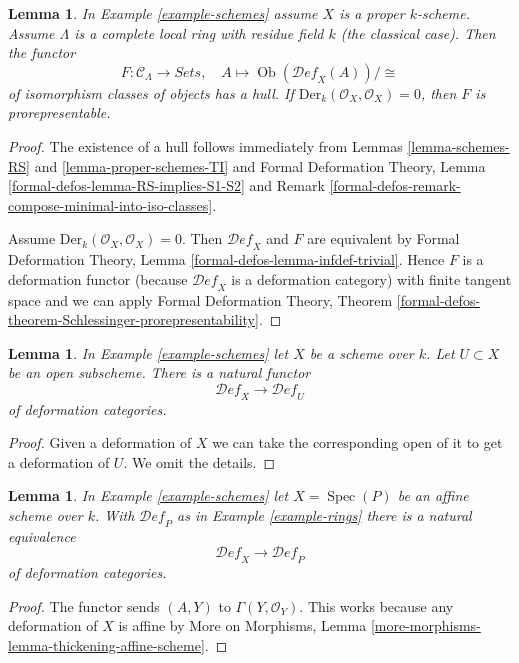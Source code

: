 \documentclass{stacks-project}
\theoremstyle{plain}
\newtheorem{lemma}[subsection]{Lemma}
\theoremstyle{definition}
\theoremstyle{remark}
\numberwithin{equation}{subsection}
\def\Spec{\mathop{\mathrm{Spec}}}
\def\Ob{\mathop{\mathrm{Ob}}\nolimits}
\def\Deformationcategory{\mathcal{D}\!\mathit{ef}}
\begin{document}
\begin{lemma}
\label{lemma-schemes-hull}
In Example \ref{example-schemes} assume $X$ is a proper $k$-scheme.
Assume $\Lambda$ is a complete local ring with residue field $k$
(the classical case). Then the functor
$$
F : \mathcal{C}_\Lambda \longrightarrow \textit{Sets},\quad
A \longmapsto \Ob(\Deformationcategory_X(A))/\cong
$$
of isomorphism classes of objects has a hull. If
$\text{Der}_k(\mathcal{O}_X, \mathcal{O}_X) = 0$, then
$F$ is prorepresentable.
\end{lemma}

\begin{proof}
The existence of a hull follows immediately from
Lemmas \ref{lemma-schemes-RS} and \ref{lemma-proper-schemes-TI} and
Formal Deformation Theory, Lemma \ref{formal-defos-lemma-RS-implies-S1-S2}
and Remark \ref{formal-defos-remark-compose-minimal-into-iso-classes}.

\medskip\noindent
Assume $\text{Der}_k(\mathcal{O}_X, \mathcal{O}_X) = 0$. Then
$\Deformationcategory_X$ and $F$ are equivalent by
Formal Deformation Theory, Lemma \ref{formal-defos-lemma-infdef-trivial}.
Hence $F$ is a deformation functor (because $\Deformationcategory_X$ is a
deformation category) with finite tangent space and we can apply
Formal Deformation Theory, Theorem
\ref{formal-defos-theorem-Schlessinger-prorepresentability}.
\end{proof}

\begin{lemma}
\label{lemma-open}
In Example \ref{example-schemes} let $X$ be a scheme over $k$.
Let $U \subset X$ be an open subscheme.
There is a natural functor
$$
\Deformationcategory_X \longrightarrow \Deformationcategory_U
$$
of deformation categories.
\end{lemma}

\begin{proof}
Given a deformation of $X$ we can take the corresponding open
of it to get a deformation of $U$. We omit the details.
\end{proof}

\begin{lemma}
\label{lemma-affine}
In Example \ref{example-schemes} let $X = \Spec(P)$ be an
affine scheme over $k$. With $\Deformationcategory_P$ as in
Example \ref{example-rings} there is a natural equivalence
$$
\Deformationcategory_X \longrightarrow \Deformationcategory_P
$$
of deformation categories.
\end{lemma}

\begin{proof}
The functor sends $(A, Y)$ to $\Gamma(Y, \mathcal{O}_Y)$.
This works because
any deformation of $X$ is affine by
More on Morphisms, Lemma \ref{more-morphisms-lemma-thickening-affine-scheme}.
\end{proof}
\end{document}
